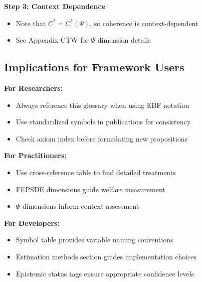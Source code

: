 \textbf{Step 3: Context Dependence}
\begin{itemize}[nosep]
    \item Note that $C^* = C^*(\Psi)$, so coherence is context-dependent
    \item See Appendix CTW for $\Psi$ dimension details
\end{itemize}

\subsection{Implications for Framework Users}
\label{sec:glossary-implications}

\begin{tcolorbox}[colback=green!5!white, colframe=green!75!black,
    title=\textbf{Practical Implications}]

\textbf{For Researchers:}
\begin{itemize}[nosep]
    \item Always reference this glossary when using EBF notation
    \item Use standardized symbols in publications for consistency
    \item Check axiom index before formulating new propositions
\end{itemize}

\textbf{For Practitioners:}
\begin{itemize}[nosep]
    \item Use cross-reference table to find detailed treatments
    \item FEPSDE dimensions guide welfare measurement
    \item $\Psi$ dimensions inform context assessment
\end{itemize}

\textbf{For Developers:}
\begin{itemize}[nosep]
    \item Symbol table provides variable naming conventions
    \item Estimation methods section guides implementation choices
    \item Epistemic status tags ensure appropriate confidence levels
\end{itemize}

\end{tcolorbox}


